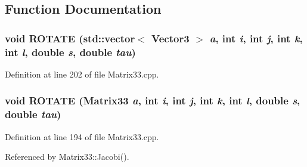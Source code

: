 \subsection{Function Documentation}
\subsubsection[{ROTATE}]{\setlength{\rightskip}{0pt plus 5cm}void ROTATE (std::vector$<$ {\bf Vector3} $>$ {\em a}, \/  int {\em i}, \/  int {\em j}, \/  int {\em k}, \/  int {\em l}, \/  double {\em s}, \/  double {\em tau})}\label{Matrix33_8cpp_a6b622e086eeab5a5c2ee9c2b8465a71d}


Definition at line 202 of file Matrix33.cpp.

\subsubsection[{ROTATE}]{\setlength{\rightskip}{0pt plus 5cm}void ROTATE ({\bf Matrix33} {\em a}, \/  int {\em i}, \/  int {\em j}, \/  int {\em k}, \/  int {\em l}, \/  double {\em s}, \/  double {\em tau})}\label{Matrix33_8cpp_a084a0c687232974c9983dfe4f3870190}


Definition at line 194 of file Matrix33.cpp.



Referenced by Matrix33::Jacobi().

